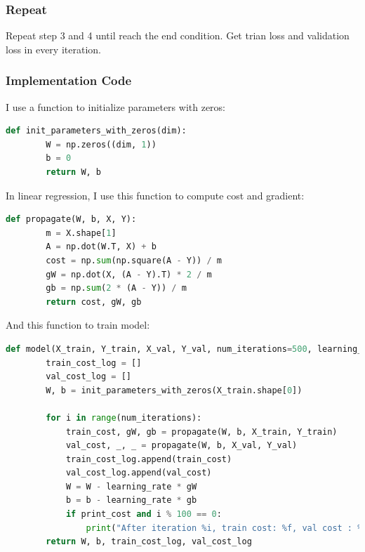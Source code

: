 \documentclass[journal, a4paper]{IEEEtran}
\begin{document}
\subsubsection{Repeat}
Repeat step 3 and 4 until reach the end condition. Get trian loss and validation loss in every iteration.
\\

\subsubsection{Implementation Code}
I use a function to initialize parameters with zeros:
\begin{lstlisting}[language=Python]
    def init_parameters_with_zeros(dim):
        W = np.zeros((dim, 1))
        b = 0
        return W, b
\end{lstlisting}
In linear regression, I use this function to compute cost and gradient:
\begin{lstlisting}[language=Python]
    def propagate(W, b, X, Y):
        m = X.shape[1]
        A = np.dot(W.T, X) + b
        cost = np.sum(np.square(A - Y)) / m
        gW = np.dot(X, (A - Y).T) * 2 / m
        gb = np.sum(2 * (A - Y)) / m
        return cost, gW, gb
\end{lstlisting}
And this function to train model:
\begin{lstlisting}[language=Python]
    def model(X_train, Y_train, X_val, Y_val, num_iterations=500, learning_rate=0.01, print_cost=False):
        train_cost_log = []
        val_cost_log = []
        W, b = init_parameters_with_zeros(X_train.shape[0])
    
        for i in range(num_iterations):
            train_cost, gW, gb = propagate(W, b, X_train, Y_train)
            val_cost, _, _ = propagate(W, b, X_val, Y_val)
            train_cost_log.append(train_cost)
            val_cost_log.append(val_cost)
            W = W - learning_rate * gW
            b = b - learning_rate * gb
            if print_cost and i % 100 == 0:
                print("After iteration %i, train cost: %f, val cost : %f" %(i, train_cost, val_cost))
        return W, b, train_cost_log, val_cost_log
\end{lstlisting}
\end{document}
